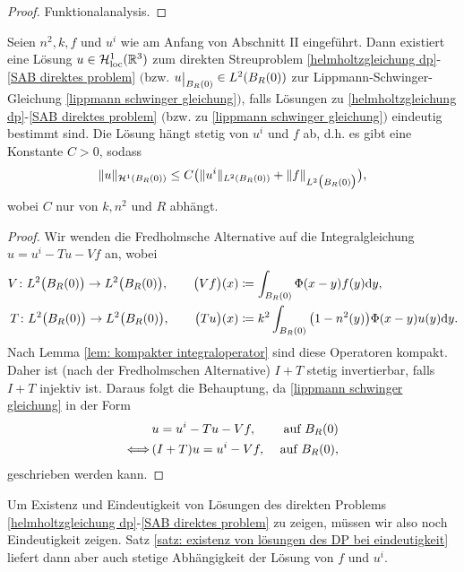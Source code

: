 \begin{proof}
	Funktionalanalysis.
\end{proof}
\begin{satz}\label{satz: existenz von lösungen des DP bei eindeutigkeit}
	Seien \(n^2,k,f\) und \(u^i\) wie am Anfang von Abschnitt II eingeführt. Dann existiert eine Lösung \(u\in\mathcal{H}_{\mathrm{loc}}^1(\mathbb{R}^3)\) zum direkten Streuproblem \eqref{helmholtzgleichung dp}-\eqref{SAB direktes problem} \(\big(\)bzw. \(u\restrict{B_R(0)}\in L^2(B_R(0))\) zur Lippmann-Schwinger-Gleichung \eqref{lippmann schwinger gleichung}\(\big)\), falls Lösungen zu \eqref{helmholtzgleichung dp}-\eqref{SAB direktes problem} \(\big(\)bzw. zu \eqref{lippmann schwinger gleichung}\(\big)\) eindeutig bestimmt sind. Die Lösung hängt stetig von \(u^i\) und \(f\) ab, d.h. es gibt eine Konstante \(C>0\), sodass
	\begin{equation*}
		\|u\|_{\mathcal{H}^1(B_R(0))}\leq C\big(\|u^i\|_{L^2(B_R(0))}+\|f\|_{L^2\big(B_R(0)\big)}\big),
	\end{equation*}
	wobei \(C\) nur von \(k,n^2\) und \(R\) abhängt.
\end{satz}
\begin{proof}
	Wir wenden die Fredholmsche Alternative auf die Integralgleichung \(u=u^i-Tu-Vf\) an, wobei
	\begin{align*}
		V\colon L^2\big(B_R(0)\big) \to L^2\big(B_R(0)\big),\qquad\big(Vf\big)(x)&\coloneqq\int_{B_R(0)}\Phi(x-y)f(y)\mathrm{d}y,\\
		T\colon L^2\big(B_R(0)\big) \to L^2\big(B_R(0)\big),\qquad\big(Tu\big)(x)&\coloneqq k^2\int_{B_R(0)}\big(1-n^2(y)\big)\Phi(x-y)u(y)\mathrm{d}y.
	\end{align*}
	Nach Lemma \ref{lem: kompakter integraloperator} sind diese Operatoren kompakt. Daher ist (nach der Fredholmschen Alternative) \(I+T\) stetig invertierbar, falls \(I+T\) injektiv ist. Daraus folgt die Behauptung, da \eqref{lippmann schwinger gleichung} in der Form
	\begin{align*}
		&u=u^i-Tu-Vf,&\text{ auf }B_R(0)\\
		\Longleftrightarrow\,&(I+T)u=u^i-Vf,&\text{ auf }B_R(0),
	\end{align*}
	geschrieben werden kann.
\end{proof}
Um Existenz und Eindeutigkeit von Lösungen des direkten Problems \eqref{helmholtzgleichung dp}-\eqref{SAB direktes problem} zu zeigen, müssen wir also noch Eindeutigkeit zeigen. Satz \ref{satz: existenz von lösungen des DP bei eindeutigkeit} liefert dann aber auch stetige Abhängigkeit der Lösung von \(f\) und \(u^i\). 

